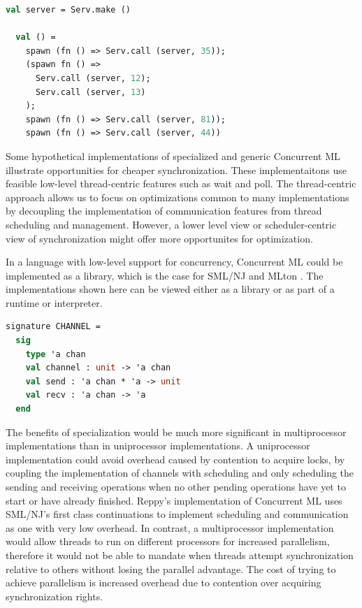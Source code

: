 \documentclass[letterpaper, 11pt]{extarticle}
\begin{document}
\begin{lstlisting}[language=ML, mathescape]
  val server = Serv.make ()

  val () =
    spawn (fn () => Serv.call (server, 35));
    (spawn fn () => 
      Serv.call (server, 12); 
      Serv.call (server, 13)
    );
    spawn (fn () => Serv.call (server, 81));
    spawn (fn () => Serv.call (server, 44))
\end{lstlisting}

Some hypothetical implementations of specialized and generic
Concurrent ML illustrate opportunities
for cheaper synchronization. These implementaitons use 
feasible low-level thread-centric features such as wait and poll. The thread-centric approach
allows us to focus on optimizations common to many implementations by decoupling the
implementation of communication features from thread scheduling and management. However, a
lower level view or scheduler-centric view of synchronization might offer more opportunites
for optimization.

In a language with low-level support for concurrency,
Concurrent ML could be implemented as a library,
which is the case for SML/NJ \cite{smlnj} and MLton \cite{mlton}.
The implementations shown here can be viewed either as a library or as part of
a runtime or interpreter.

\begin{lstlisting}[language=ML, mathescape]
  signature CHANNEL =
  sig
    type 'a chan 
    val channel : unit -> 'a chan
    val send : 'a chan * 'a -> unit
    val recv : 'a chan -> 'a
  end     
\end{lstlisting}

The benefits of specialization would be much more significant in multiprocessor
implementations than in uniprocessor implementations. A uniprocessor
implementation could avoid overhead caused by contention to acquire locks, by coupling the
implementation of channels with scheduling and only scheduling the sending and receiving
operations when no other pending operations have yet to start or have already finished.
Reppy's implementation of
Concurrent ML uses SML/NJ's first class continuations to implement scheduling and communication
as one with very low overhead. In contrast, a multiprocessor
implementation would allow threads to run
on different processors for increased parallelism,
therefore it would not be able to mandate when
threads attempt synchronization relative to others without losing the parallel advantage.
The cost of trying to achieve parallelism
is increased overhead due to contention over acquiring
synchronization rights. 
\end{document}
